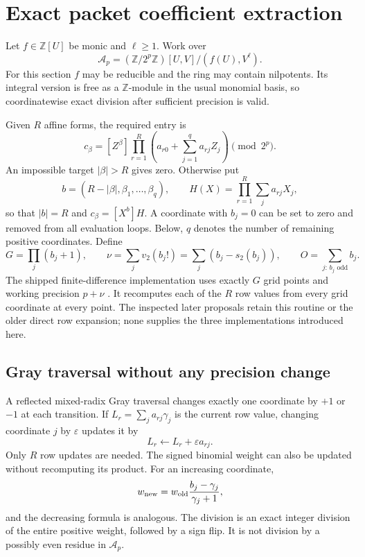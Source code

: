 \documentclass[11pt,letterpaper]{article}
\theoremstyle{definition}\newtheorem{definition}[theorem]{Definition}
\theoremstyle{remark}\newtheorem{remark}[theorem]{Remark}
\newcommand{\Aring}{\mathcal A}
\newcommand{\vv}{v_2}
\newcommand{\pop}{s_2}
\begin{document}
\section{Exact packet coefficient extraction}
\label{sec:extraction}
Let $f\in\mathbb Z[U]$ be monic and $\ell\ge1$. Work over
\[
 \Aring_p=(\mathbb Z/2^p\mathbb Z)[U,V]/(f(U),V^\ell).
\]
For this section $f$ may be reducible and the ring may contain nilpotents.
Its integral version is free as a $\mathbb Z$-module in the usual monomial
basis, so coordinatewise exact division after sufficient precision is valid.

Given $R$ affine forms, the required entry is
\begin{equation}\label{eq:target}
 c_\beta=[Z^\beta]\prod_{r=1}^R
 \left(a_{r0}+\sum_{j=1}^q a_{rj}Z_j\right)\pmod{2^p}.
\end{equation}
An impossible target $|\beta|>R$ gives zero. Otherwise put
\[
 b=(R-|\beta|,\beta_1,\ldots,\beta_q),\qquad
 H(X)=\prod_{r=1}^R\sum_j a_{rj}X_j,
\]
so that $|b|=R$ and $c_\beta=[X^b]H$. A coordinate with $b_j=0$ can be
set to zero and removed from all evaluation loops. Below, $q$ denotes the
number of remaining positive coordinates. Define
\begin{equation}\label{eq:grid-parameters}
 G=\prod_j(b_j+1),\qquad
 \nu=\sum_j\vv(b_j!)=\sum_j(b_j-\pop(b_j)),\qquad
 O=\sum_{j:\,b_j\text{ odd}}b_j.
\end{equation}
The shipped finite-difference implementation uses exactly $G$ grid points
and working precision $p+\nu$ \cite{extraction}. It recomputes each of the
$R$ row values from every grid coordinate at every point. The inspected
later proposals retain this routine or the older direct row expansion;
none supplies the three implementations introduced here.

\subsection{Gray traversal without any precision change}
A reflected mixed-radix Gray traversal changes exactly one coordinate by
$+1$ or $-1$ at each transition. If $L_r=\sum_j a_{rj}\gamma_j$ is the
current row value, changing coordinate $j$ by $\varepsilon$ updates it by
\[
 L_r\longleftarrow L_r+\varepsilon a_{rj}.
\]
Only $R$ row updates are needed. The signed binomial weight can also be
updated without recomputing its product. For an increasing coordinate,
\[
 w_{\rm new}=w_{\rm old}\frac{b_j-\gamma_j}{\gamma_j+1},
\]
and the decreasing formula is analogous. The division is an exact integer
division of the entire positive weight, followed by a sign flip. It is not
division by a possibly even residue in $\Aring_p$.
\end{document}
